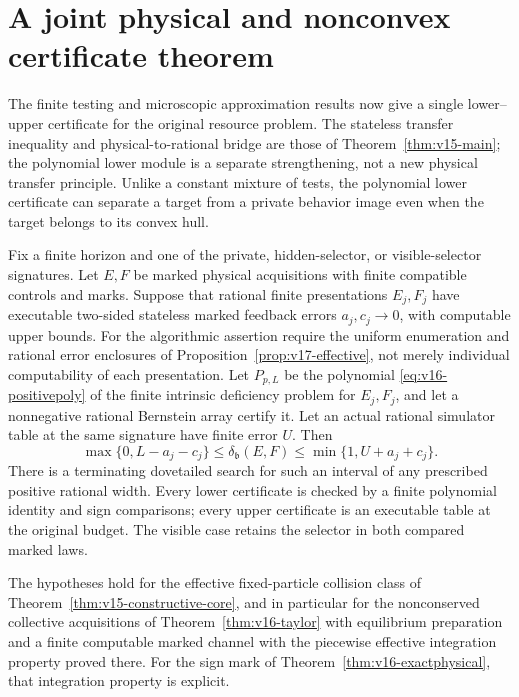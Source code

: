 \section{A joint physical and nonconvex certificate theorem}
\label{sec:v16-joint}
The finite testing and microscopic approximation results now give a
single lower--upper certificate for the original resource problem.
The stateless transfer inequality and physical-to-rational bridge
are those of Theorem~\ref{thm:v15-main}; the polynomial lower module
is a separate strengthening, not a new physical transfer principle.
Unlike a constant mixture of tests, the polynomial lower certificate
can separate a target from a private behavior image even when the
target belongs to its convex hull.

\begin{theorem}
\label{thm:v16-main}
Fix a finite horizon and one of the private, hidden-selector, or
visible-selector signatures. Let $E,F$ be marked physical acquisitions
with finite compatible controls and marks. Suppose that rational finite
presentations $E_j,F_j$ have executable two-sided stateless marked
feedback errors $a_j,c_j\to0$, with computable upper bounds. For the algorithmic assertion require
the uniform enumeration and rational error enclosures of
Proposition~\ref{prop:v17-effective}, not merely individual
computability of each presentation. Let
$P_{p,L}$ be the polynomial \eqref{eq:v16-positivepoly} of the finite
intrinsic deficiency problem for $E_j,F_j$, and let a nonnegative
rational Bernstein array certify it. Let an actual rational simulator
table at the same signature have finite error $U$. Then
\begin{equation}\label{eq:v16-main}
 \max\{0,L-a_j-c_j\}\le\delta_{\mathfrak b}(E,F)
                \le\min\{1,U+a_j+c_j\}.
\end{equation}
There is a terminating dovetailed search for such an interval of any
prescribed positive rational width. Every lower certificate is checked
by a finite polynomial identity and sign comparisons; every upper
certificate is an executable table at the original budget. The visible
case retains the selector in both compared marked laws.

The hypotheses hold for the effective fixed-particle collision class
of Theorem~\ref{thm:v15-constructive-core}, and in particular for the
nonconserved collective acquisitions of Theorem~\ref{thm:v16-taylor}
with equilibrium preparation and a finite computable marked channel
with the piecewise effective integration property proved there.
For the sign mark of Theorem~\ref{thm:v16-exactphysical}, that integration
property is explicit.
\end{theorem}
